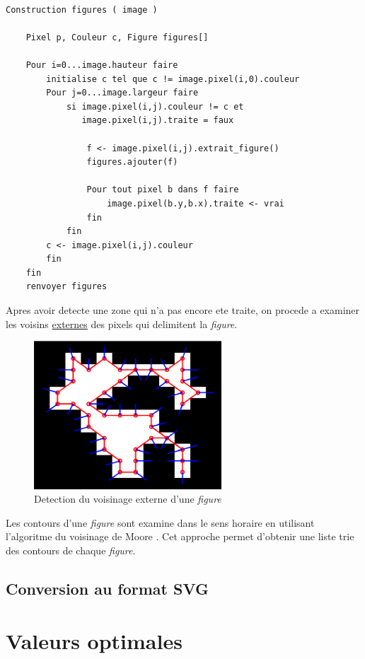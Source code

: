 \documentclass[twoside,openright,a4paper,11pt,french]{article}
\begin{document}
\begin{lstlisting}[frame=single]  % Start your code-block

Construction figures ( image )

    Pixel p, Couleur c, Figure figures[]

    Pour i=0...image.hauteur faire
        initialise c tel que c != image.pixel(i,0).couleur 
        Pour j=0...image.largeur faire
            si image.pixel(i,j).couleur != c et 
               image.pixel(i,j).traite = faux

                f <- image.pixel(i,j).extrait_figure()
                figures.ajouter(f)

                Pour tout pixel b dans f faire
                    image.pixel(b.y,b.x).traite <- vrai
                fin 
            fin 
        c <- image.pixel(i,j).couleur
        fin
    fin
    renvoyer figures
\end{lstlisting}


Apres avoir detecte une zone qui n'a pas encore ete traite, on procede
a examiner les voisins \underline{externes} des pixels qui delimitent
la {\it figure}.

\begin{figure}[h]
\centering
\includegraphics[width=7cm]{./pics/moore.eps}
\caption{Detection du voisinage externe d'une {\it figure}}
\label{fig:moore}
\end{figure}

Les contours d'une {\it figure} sont examine dans le sens horaire en
utilisant l'algoritme du voisinage de Moore \cite{url-moore}. Cet
approche permet d'obtenir une liste trie des contours de chaque {\it
figure}.


\subsection{Conversion au format SVG}


\section{Valeurs optimales}



\newpage
{}


\end{document}
